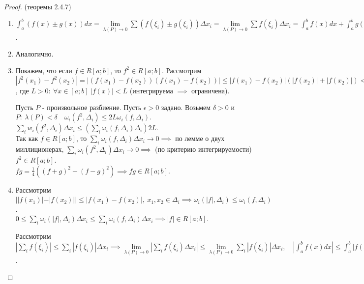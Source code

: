\documentclass{report}
\theoremstyle{definition}
\begin{document}
\begin{proof}
  (теоремы 2.4.7)

  \begin{enumerate}
    \item $\int_{a}^{b}(f(x)\pm g(x))dx = \underset{\lambda(P)\rightarrow0}{\lim}\sum(f(\xi_{i})
            \pm g(\xi_{i}))\Delta x_{i} = \underset{\lambda(P)\rightarrow0}{\lim}\sum f(\xi_{i})\Delta
            x_{i} = \int_{a}^{b}f(x)dx + \int_{a}^{b}g(x)dx$.
    \item Аналогично.
    \item Покажем, что если $f\in R[a;b]$, то $f^{2}\in R[a;b]$. Рассмотрим $| f^{2}(x_{1}) -
            f^{2}(x_{2}) | = | (f(x_{1}) - f(x_{2}))(f(x_{1}) - f(x_{2})) | \leqslant | f(x_{1}) -
            f(x_{2}) |(|f(x_{2})| + | f(x_{2}) |) < 2L| f(x_{1}) - f(x_{2}) |$, где $L>0: \ \forall x
            \in [a;b] \ | f(x) | < L$ (интегрируема $\implies$ ограничена).

          Пусть $P$ - произвольное разбиение. Пусть $\epsilon > 0$ задано. Возьмем $\delta>0$ и
          $P: \ \lambda(P) < \delta \quad \omega_{i}(f^{2},\Delta_{i}) \leqslant 2L\omega_{i}
            (f,\Delta_{i})$.\\

          $\underset{i}{\sum}w_{i}(f^{2},\Delta_{i})\Delta x_{i} \leqslant (\underset{i}{\sum}\omega_{i}(f,
              \Delta_{i})\Delta_{i})2L$.\\

          Так как $f\in R[a;b]$, то $\underset{i}{\sum}\omega_{i}(f,\Delta_{i})\Delta x_{i}\rightarrow 0
            \implies$ по лемме о двух миллиционерах, $\underset{i}{\sum}\omega_{i}(f^{2},\Delta_{i})\Delta
            x_{i}\rightarrow0 \implies$ (по критерию интегрируемости) $f^{2}\in R[a;b]$.\\

          $fg = \frac{1}{4}((f+g)^{2}-(f-g)^{2})\implies fg \in R[a;b]$.
    \item Рассмотрим $||f(x_{1})| - | f(x_{2}) || \leqslant | f(x_{1}) - f(x_{2}) |, \ x_{1},x_{2}\in
            \Delta_{i} \implies \omega_{i}(|f|,\Delta_{i})\leqslant \omega_{i}(f,\Delta_{i})$. \\

          $0 \leqslant \underset{i}{\sum}\omega_{i}(| f |,\Delta_{i})\Delta x_{i} \leqslant \underset{i}{\sum}
            \omega_{i}(f,\Delta_{i})\Delta x_{i} \implies |f|\in R[a;b].$

          Рассмотрим $| \underset{i}{\sum}f(\xi_{i}) | \leqslant \underset{i}{\sum} | f(\xi_{i}) |\Delta x_{i}
            \implies \underset{\lambda(P)\rightarrow 0}{\lim}| \underset{i}{\sum}f(\xi_{i})\Delta x_{i} |
            \leqslant \underset{\lambda(P)\rightarrow0}{\lim}\underset{i}{\sum} | f(\xi_{i}) |\Delta x_{i}, \quad
            | \int_{a}^{b}f(x)dx | \leqslant \int_{a}^{b} |f(x)|dx$.
  \end{enumerate}
\end{proof}
\end{document}
